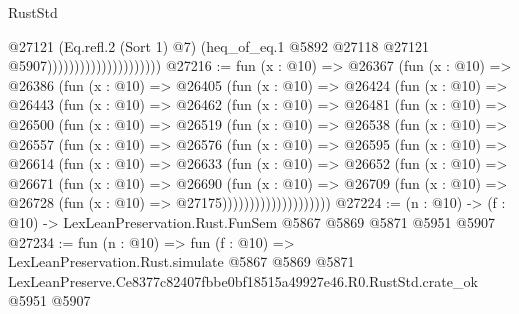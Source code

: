 \begin{lexlean}{RustStd}
\begin{coremodule}
                                            @27121
                                            (Eq.refl.{2} (Sort 1) @7)
                                            (heq_of_eq.{1}
                                              @5892
                                              @27118
                                              @27121
                                              @5907)))))))))))))))))))))
@27216 := fun (x : @10) =>
  @26367
    (fun (x : @10) =>
    @26386
      (fun (x : @10) =>
      @26405
        (fun (x : @10) =>
        @26424
          (fun (x : @10) =>
          @26443
            (fun (x : @10) =>
            @26462
              (fun (x : @10) =>
              @26481
                (fun (x : @10) =>
                @26500
                  (fun (x : @10) =>
                  @26519
                    (fun (x : @10) =>
                    @26538
                      (fun (x : @10) =>
                      @26557
                        (fun (x : @10) =>
                        @26576
                          (fun (x : @10) =>
                          @26595
                            (fun (x : @10) =>
                            @26614
                              (fun (x : @10) =>
                              @26633
                                (fun (x : @10) =>
                                @26652
                                  (fun (x : @10) =>
                                  @26671
                                    (fun (x : @10) =>
                                    @26690
                                      (fun (x : @10) =>
                                      @26709
                                        (fun (x : @10) =>
                                        @26728 (fun (x : @10) => @27175))))))))))))))))))))
@27224 := (n : @10) -> (f : @10) -> LexLeanPreservation.Rust.FunSem @5867 @5869 @5871 @5951 @5907
@27234 := fun (n : @10) =>
  fun (f : @10) =>
  LexLeanPreservation.Rust.simulate
    @5867
    @5869
    @5871
    LexLeanPreserve.Ce8377c82407fbbe0bf18515a49927e46.R0.RustStd.crate_ok
    @5951
    @5907
\end{coremodule}
\end{lexlean}
